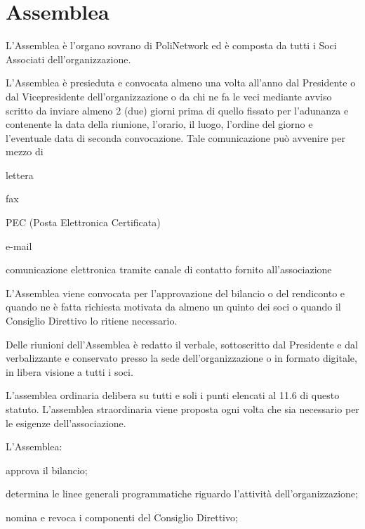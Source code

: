 \documentclass[legalpaper, 11pt]{exam}
\let\tempone\enumerate
\let\temptwo\endenumerate
\renewenvironment{enumerate}{\tempone\addtolength{\itemsep}{-0.45\baselineskip}}{\temptwo}
\begin{document}
\section{Assemblea}

\begin{enumerate}
	\item L'Assemblea è l’organo sovrano di PoliNetwork ed è composta da tutti i Soci Associati dell’organizzazione.
	\item L’Assemblea è presieduta e convocata almeno una volta all'anno dal Presidente o dal Vicepresidente dell'organizzazione o da chi ne fa le veci mediante avviso scritto da inviare almeno 2 (due) giorni prima di quello fissato per l'adunanza e contenente la data della riunione, l'orario, il luogo, l'ordine del giorno e l'eventuale data di seconda convocazione.
	Tale comunicazione può avvenire per mezzo di
	\vspace{-5pt}
	\begin{enumerate}
		\item lettera
		\item fax
		\item PEC (Posta Elettronica Certificata)
		\item e-mail
		\item comunicazione elettronica tramite canale di contatto fornito all’associazione
	\end{enumerate}
	\item L'Assemblea viene convocata per l’approvazione del bilancio o del rendiconto e quando ne è fatta richiesta motivata da almeno un quinto dei soci o quando il Consiglio Direttivo lo ritiene necessario.
	\item Delle riunioni dell'Assemblea è redatto il verbale, sottoscritto dal Presidente e dal verbalizzante e conservato presso la sede dell'organizzazione o in formato digitale, in libera visione a tutti i soci.
	\item L'assemblea ordinaria delibera su tutti e soli i punti elencati al 11.6 di questo statuto. L'assemblea straordinaria viene proposta ogni volta che sia necessario per le esigenze dell'associazione.
	\item L'Assemblea:
	\vspace{-5pt}
	\begin{enumerate}
		\item approva il bilancio;
		\item determina le linee generali programmatiche riguardo l’attività dell’organizzazione;
		\item nomina e revoca i componenti del Consiglio Direttivo;

\end{enumerate}
\end{enumerate}
\end{document}
